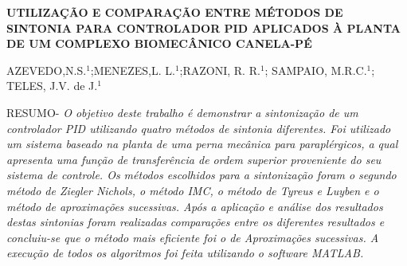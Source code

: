 \documentclass[article,12pt,oneside,a4paper,english,brazil,sumario=tradicional]{abntex2}
\begin{document}
\frenchspacing %

\begin{center}
    \SingleSpacing
	\uppercase{\bfseries{\Large{Utilização e comparação entre métodos de Sintonia para Controlador PID aplicados à planta de um complexo Biomecânico Canela-pé}}}
	\vspace{12pt}
	\\
\end{center}

\begin{center}
	\normalsize{AZEVEDO,N.S.$^1$;MENEZES,L. L.$^1$;RAZONI, R. R.$^1$; SAMPAIO, M.R.C.$^1$; TELES, J.V. de J.$^1$}
	\begin{center}

	\end{center}


\end{center}

\begin{flushleft}
\begin{SingleSpace}
\RaggedRight
\noindent
\small{RESUMO-}
\noindent
\normalsize{\textit{O objetivo deste trabalho é demonstrar a sintonização de um controlador PID utilizando quatro métodos de sintonia diferentes. Foi utilizado um sistema baseado
na planta de uma perna mecânica para paraplérgicos, a qual apresenta uma função de transferência de ordem superior proveniente do seu sistema de controle. Os métodos escolhidos para a sintonização foram o segundo método de Ziegler Nichols, o método IMC, o método de Tyreus e Luyben e o método de aproximações sucessivas. Após a aplicação e análise dos resultados destas sintonias foram realizadas comparações entre os diferentes resultados e concluiu-se que o método mais eficiente foi o de Aproximações sucessivas. A execução de todos os algoritmos foi feita utilizando o software MATLAB.}}

\end{SingleSpace}



\end{flushleft}
\end{document}
